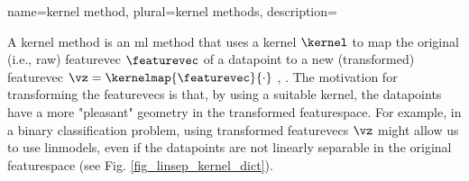 {name={kernel method}, 
plural={kernel methods}, 
	description={A \gls{kernel} method is an \gls{ml} method that uses a 
		\gls{kernel} $\kernel$ to map the original (i.e., raw) \gls{featurevec} $\featurevec$ of a 
		\gls{datapoint} to a new (transformed) \gls{featurevec} $\vz = \kernelmap{\featurevec}{\cdot}$ \cite{LearningKernelsBook}, \cite{LampertNowKernel}.
		The motivation for transforming the \glspl{featurevec} is that, by using a suitable \gls{kernel}, 
		the \glspl{datapoint} have a more "pleasant" geometry in the transformed \gls{featurespace}. 
		For example, in a binary \gls{classification} problem, using transformed \glspl{featurevec} $\vz$ might 
		allow us to use \glspl{linmodel}, even if the \glspl{datapoint} are not linearly 
		separable in the original \gls{featurespace} (see Fig. \ref{fig_linsep_kernel_dict}). 
\begin{figure}[H]
\begin{center}
\end{center}
\end{figure}}}
